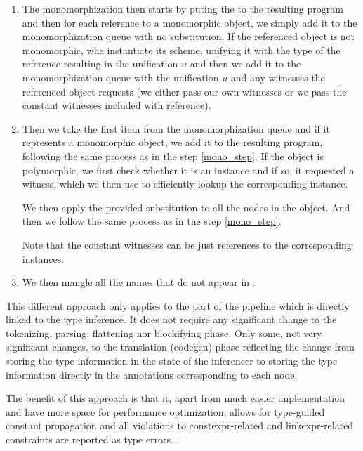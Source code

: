 \begin{enumerate}
    \item The monomorphization then starts by puting the  to the resulting program and then for each reference to a monomorphic object, we simply add it to the monomorphization queue with no substitution. If the referenced object is not monomorphic, whe instantiate its scheme, unifying it with the type of the reference resulting in the unification $u$ and then we add it to the monomorphization queue with the unification $u$ and any witnesses the referenced object requests (we either pass our own witnesses or we pass the constant witnesses included with reference). \label{mono_step}

    \item Then we take the first item from the monomorphization queue and if it represents a monomorphic object, we add it to the resulting program, following the same process as in the step \ref{mono_step}. If the object is polymorphic, we first check whether it is an instance and if so, it requested a witness, which we then use to efficiently lookup the corresponding instance.

    We then apply the provided substitution to all the nodes in the object. And then we follow the same process as in the step \ref{mono_step}.

    Note that the constant witnesses can be just references to the corresponding instances.

    \item We then mangle all the names that do not appear in .
\end{enumerate}

This different approach only applies to the part of the pipeline which is directly linked to the type inference. It does not require any significant change to the tokenizing, parsing, flattening nor blockifying phase. Only some, not very significant changes, to the translation (codegen) phase reflecting the change from storing the type information in the state of the inferencer to storing the type information directly in the annotations corresponding to each node.

The benefit of this approach is that it, apart from much easier implementation and have more space for performance optimization, allows for type-guided constant propagation and all violations to constexpr-related and linkexpr-related constraints are reported as type errors. .

